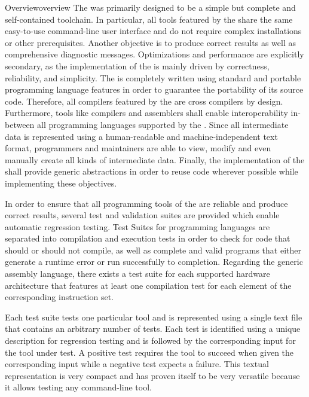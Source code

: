 \begin{presentation}{Overview}{overview}
The \ecs{} was primarily designed to be a simple but complete and self-contained toolchain.
In particular, all tools featured by the \ecs{} share the same easy-to-use command-line user interface and do not require complex installations or other prerequisites.
Another objective is to produce correct results as well as comprehensive diagnostic messages.
Optimizations and performance are explicitly secondary, as the implementation of the \ecs{} is mainly driven by correctness, reliability, and simplicity.
The \ecs{} is completely written using standard and portable programming language features in order to guarantee the portability of its source code.
Therefore, all compilers featured by the \ecs{} are cross compilers by design.
Furthermore, tools like compilers and assemblers shall enable interoperability in-between all programming languages supported by the \ecs{}.
Since all intermediate data is represented using a human-readable and machine-independent text format, programmers and maintainers are able to view, modify and even manually create all kinds of intermediate data.
Finally, the implementation of the \ecs{} shall provide generic abstractions in order to reuse code wherever possible while implementing these objectives.


In order to ensure that all programming tools of the \ecs{} are reliable and produce correct results, several test and validation suites are provided which enable automatic regression testing.
Test Suites for programming languages are separated into compilation and execution tests in order to check for code that should or should not compile, as well as complete and valid programs that either generate a runtime error or run successfully to completion.
Regarding the generic assembly language, there exists a test suite for each supported hardware architecture that features at least one compilation test for each element of the corresponding instruction set.


Each test suite tests one particular tool and is represented using a single text file that contains an arbitrary number of tests.
Each test is identified using a unique description for regression testing and is followed by the corresponding input for the tool under test.
A positive test requires the tool to succeed when given the corresponding input while a negative test expects a failure.
This textual representation is very compact and has proven itself to be very versatile because it allows testing any command-line tool.


\end{presentation}
